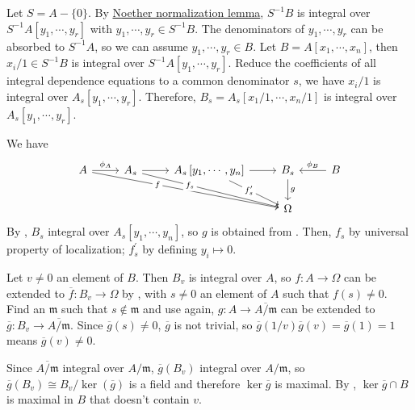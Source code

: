 \begin{exercise}\label{ex5.20}
	Let $S=A-\{0\}$. By \hyperref[noethernormalization]{Noether normalization lemma}, $S^{-1}B$ is integral over $S^{-1}A\left[y_1,\cdots,y_r\right]$ with $y_1,\cdots,y_r\in S^{-1}B$. The denominators of $y_1,\cdots,y_r$ can be absorbed to $S^{-1}A$, so we can assume $y_1,\cdots,y_r\in B$. Let $B=A\left[x_1,\cdots,x_n\right]$, then $x_i/1\in S^{-1}B$ is integral over $S^{-1}A\left[y_1,\cdots,y_r\right]$. Reduce the coefficients of all integral dependence equations to a common denominator $s$, we have $x_i/1$ is integral over $A_s\left[y_1,\cdots,y_r\right]$. Therefore, $B_s=A_s\left[x_1/1,\cdots,x_n/1\right]$ is integral over $A_s\left[y_1,\cdots,y_r\right]$.
\end{exercise}

\begin{exercise}\label{ex5.21}
	We have
	\begin{equation*}
		\begin{tikzcd}
			A\arrow[r,"\phi_A"]\arrow[drrr,"f"{description,pos=0.35}]&A_s\arrow[r]\arrow[drr,"f_s"{description,pos=0.35}]&A_s\left[y_1,\cdots,y_n\right]\arrow[r]\arrow[dr,"f_s^\prime"{description,pos=0.4}]
			&B_s\arrow[d,"g"]&B\arrow[l,"\phi_B"']\\
			&&&\Omega&
		\end{tikzcd}
	\end{equation*}
	By , $B_s$ integral over $A_s\left[y_1,\cdots,y_n\right]$, so $g$ is obtained from . Then, $f_s$ by universal property of localization; $f_s^\prime$ by defining $y_i\mapsto0$. 
\end{exercise}

\begin{exercise}\label{ex5.22}
	Let $v\neq0$ an element of $B$. Then $B_v$ is integral over $A$, so $f:A\rightarrow\Omega$ can be extended to $\overline{f}:B_v\rightarrow\Omega$ by , with $s\neq0$ an element of $A$ such that $f(s)\neq0$. Find an $\mathfrak{m}$ such that $s\notin\mathfrak{m}$ and use  again, $g:A\rightarrow\overline{A/\mathfrak{m}}$ can be extended to $\overline{g}:B_v\rightarrow\overline{A/\mathfrak{m}}$. Since $\overline{g}(s)\neq0$, $\overline{g}$ is not trivial, so $\overline{g}(1/v)\overline{g}(v)=\overline{g}(1)=1$ means $\overline{g}(v)\neq0$.
	
	Since $\overline{A/\mathfrak{m}}$ integral over $A/\mathfrak{m}$, $\overline{g}\left(B_v\right)$ integral over $A/\mathfrak{m}$, so $\overline{g}\left(B_v\right)\cong B_v/\ker\left(\overline{g}\right)$ is a field and therefore $\ker\overline{g}$ is maximal. By , $\ker\overline{g}\cap B$ is maximal in $B$ that doesn't contain $v$.
\end{exercise}

